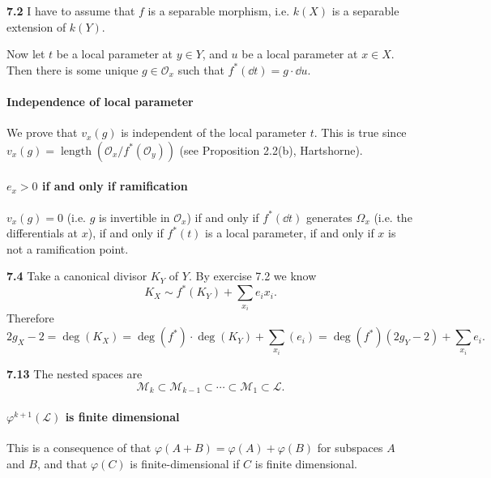 \documentclass{article}
\makeatletter
\newcommand*{\shifttext}[1]{%
  \settowidth{\@tempdima}{#1}%
  \hspace{-\@tempdima}#1%
}
\newcommand{\plabel}[1]{%
\shifttext{\textbf{#1}\quad}%
}
\newcommand{\prule}{%
\begin{center}%
\hdashrule[0.5ex]{.99\linewidth}{1pt}{1pt 2.5pt}%
\end{center}%
}
\makeatother
\begin{document}
\prule
\plabel{7.2}%
I have to assume that $f$ is a separable morphism, i.e. $k(X)$ is a separable extension of $k(Y)$.
\par
Now let $t$ be a local parameter at $y\in Y$, and $u$ be a local parameter at $x\in X$.
Then there is some unique $g\in \mathcal{O}_{x}$ such that $f^*(\dd{t}) = g\cdot \dd{u}$.

\paragraph*{Independence of local parameter}
We prove that $v_x(g)$ is independent of the local parameter $t$.
This is true since $v_x(g) = \operatorname{length}(\mathcal{O}_x/f^*(\mathcal{O}_y))$ (see Proposition 2.2(b), Hartshorne).
\paragraph*{$e_x > 0$ if and only if ramification}
$v_x(g) = 0$ (i.e. $g$ is invertible in $\mathcal{O}_x$) if and only if $f^*{(\dd{t})}$ generates $\Omega_x$ (i.e. the differentials at $x$), if and only if $f^*(t)$ is a local parameter, if and only if $x$ is not a ramification point.

\plabel{7.4}%
Take a canonical divisor $K_Y$ of $Y$.
By exercise 7.2 we know
\[ K_X \sim f^*(K_Y) + \sum_{x_i} e_i x_i. \]
Therefore
\[ 2g_X - 2 = \deg (K_X) = \deg(f^*)\cdot \deg(K_Y) + \sum_{x_i} (e_i) = \deg(f^*)(2g_Y-2) + \sum_{x_i} e_i. \]

\plabel{7.13}%
The nested spaces are
\[ \mathcal{M}_{k} \subset \mathcal{M}_{k-1} \subset \cdots \subset \mathcal{M}_1 \subset \mathcal{L}. \]
\paragraph*{$\varphi^{k+1}(\mathcal{L})$ is finite dimensional}%
This is a consequence of that $\varphi(A+B) = \varphi(A)+\varphi(B)$ for subspaces $A$ and $B$, and that $\varphi(C)$ is finite-dimensional if $C$ is finite dimensional.
\end{document}
